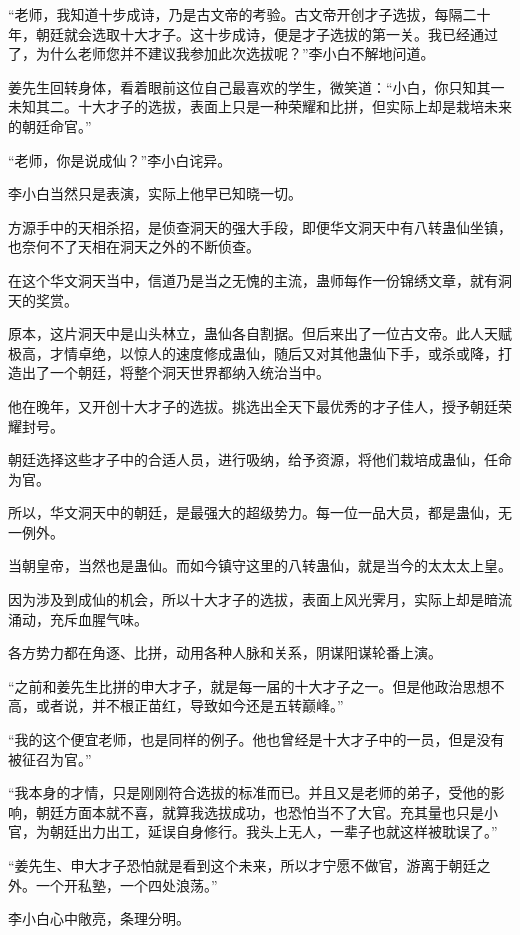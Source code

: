 \begin{this_body}
“老师，我知道十步成诗，乃是古文帝的考验。古文帝开创才子选拔，每隔二十年，朝廷就会选取十大才子。这十步成诗，便是才子选拔的第一关。我已经通过了，为什么老师您并不建议我参加此次选拔呢？”李小白不解地问道。

姜先生回转身体，看着眼前这位自己最喜欢的学生，微笑道：“小白，你只知其一未知其二。十大才子的选拔，表面上只是一种荣耀和比拼，但实际上却是栽培未来的朝廷命官。”

“老师，你是说成仙？”李小白诧异。

李小白当然只是表演，实际上他早已知晓一切。

方源手中的天相杀招，是侦查洞天的强大手段，即便华文洞天中有八转蛊仙坐镇，也奈何不了天相在洞天之外的不断侦查。

在这个华文洞天当中，信道乃是当之无愧的主流，蛊师每作一份锦绣文章，就有洞天的奖赏。

原本，这片洞天中是山头林立，蛊仙各自割据。但后来出了一位古文帝。此人天赋极高，才情卓绝，以惊人的速度修成蛊仙，随后又对其他蛊仙下手，或杀或降，打造出了一个朝廷，将整个洞天世界都纳入统治当中。

他在晚年，又开创十大才子的选拔。挑选出全天下最优秀的才子佳人，授予朝廷荣耀封号。

朝廷选择这些才子中的合适人员，进行吸纳，给予资源，将他们栽培成蛊仙，任命为官。

所以，华文洞天中的朝廷，是最强大的超级势力。每一位一品大员，都是蛊仙，无一例外。

当朝皇帝，当然也是蛊仙。而如今镇守这里的八转蛊仙，就是当今的太太太上皇。

因为涉及到成仙的机会，所以十大才子的选拔，表面上风光霁月，实际上却是暗流涌动，充斥血腥气味。

各方势力都在角逐、比拼，动用各种人脉和关系，阴谋阳谋轮番上演。

“之前和姜先生比拼的申大才子，就是每一届的十大才子之一。但是他政治思想不高，或者说，并不根正苗红，导致如今还是五转巅峰。”

“我的这个便宜老师，也是同样的例子。他也曾经是十大才子中的一员，但是没有被征召为官。”

“我本身的才情，只是刚刚符合选拔的标准而已。并且又是老师的弟子，受他的影响，朝廷方面本就不喜，就算我选拔成功，也恐怕当不了大官。充其量也只是小官，为朝廷出力出工，延误自身修行。我头上无人，一辈子也就这样被耽误了。”

“姜先生、申大才子恐怕就是看到这个未来，所以才宁愿不做官，游离于朝廷之外。一个开私塾，一个四处浪荡。”

李小白心中敞亮，条理分明。


\end{this_body}
